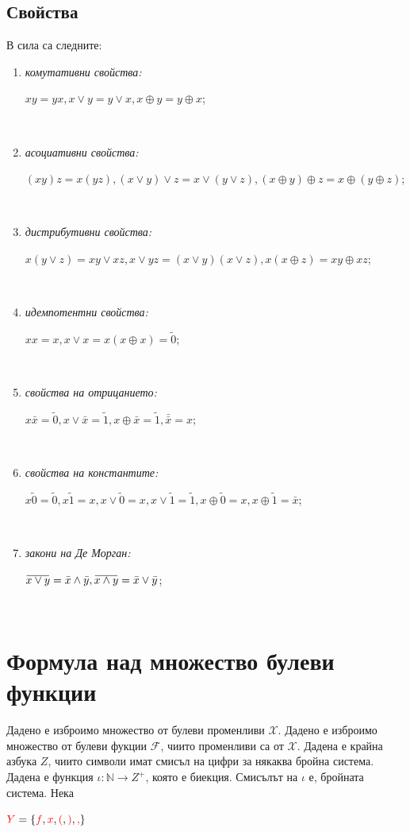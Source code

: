 \documentclass[11pt]{article} %
\newcommand{\redText}[1]{\textcolor{red}{#1}}
\newcommand{\curlies}[1]{\{#1\}}
\newcommand{\overbar}[1]{\mkern 1.5mu\overline{\mkern-1.5mu#1\mkern-1.5mu}\mkern 1.5mu}
\newcommand{\enumlet}{\renewcommand{\theenumi}{\alph{enumi}}}
\begin{document}
\subsection{Свойства}
В сила са следните:
\enumlet
\begin{enumerate}
	\item \textit{комутативни свойства:}\\ 
		\centerline{$xy = yx, x \vee y = y \vee x, x \oplus y = y \oplus x$;} \\
	\item \textit{асоциативни свойства:}\\ 
		\centerline{$(xy)z = x(yz), (x \vee y) \vee z = x \vee (y \vee z), (x \oplus y)\oplus z = x \oplus (y \oplus z)$;} \\
	\item \textit{дистрибутивни свойства:}\\ 
		\centerline{$x(y \vee z) = xy \vee xz, x \vee yz = (x \vee y)(x \vee z), x(x \oplus z) = xy \oplus xz$;} \\
	\item \textit{идемпотентни свойства:}\\ 
		\centerline{$xx = x, x \vee x = x(x \oplus x) = \tilde{0}$;} \\
	\item \textit{свойства на отрицанието:}\\ 
		\centerline{$x\bar{x} = \tilde{0}, x \vee \bar{x} = \tilde{1}, x \oplus \bar{x} = \tilde{1}, \bar{\bar{x}} = x$;} \\
	\item \textit{свойства на константите:}\\ 
		\centerline{$x\tilde{0} = \tilde{0}, x\tilde{1} = x, x \vee \tilde{0} = x, x \vee \tilde{1} = \tilde{1}, x \oplus \tilde{0} = x, x \oplus \tilde{1} = \bar{x}$;} \\
	\item \textit{закони на Де Морган:}\\ 
		\centerline{$\overbar{x \vee y} = \bar{x} \wedge \bar{y},\overbar{x \wedge y} = \bar{x} \vee \bar{y}$;} \\
\end{enumerate}

\section{Формула над множество булеви функции \cite{fmiLectures}}

Дадено е изброимо множество от булеви променливи $\mathcal{X}$. Дадено е изброимо множество
от булеви фукции $\mathcal{F}$, чиито променливи са от $\mathcal{X}$. Дадена е крайна азбука $Z$, чиито символи
имат смисъл на цифри за някаква бройна система. Дадена е функция $\iota : \mathbb{N} \to Z^{+}$, която е
биекция. Смисълът на $\iota$ е, бройната система. Нека\\
\centerline{$\redText{Y} = \curlies{\redText{f}, \redText{x}, \redText{(}, \redText{)}, \redText{,}}$}\\
\end{document}
